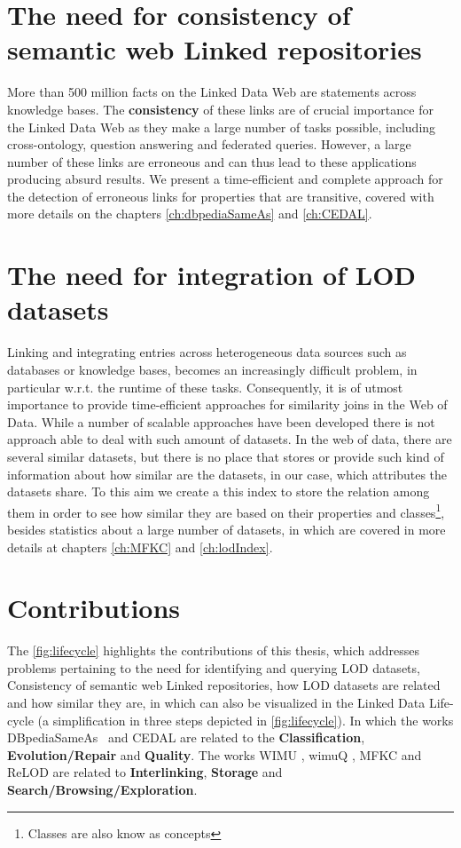 \section{The need for consistency of semantic web Linked repositories}
More than 500 million facts on the Linked Data Web are statements across knowledge bases. The \textbf{consistency} of these links are of crucial importance for the Linked Data Web as they make a large number of tasks possible, including  cross-ontology, question answering and federated queries. However, a large number of these links are erroneous and can thus lead to these applications producing absurd results. We present a time-efficient and complete approach for the detection of erroneous links for properties that are transitive\cite{valdestilhasdbpediasameas, valdestilhas2017cedal}, covered with more details on the chapters \ref{ch:dbpediaSameAs} and \ref{ch:CEDAL}.

\section{The need for integration of LOD datasets}
Linking and integrating entries across heterogeneous data sources such as databases or knowledge bases, becomes an increasingly difficult problem, in particular w.r.t. the runtime of these tasks. Consequently, it is of utmost importance to provide time-efficient approaches for similarity joins in the Web of Data. While a number of scalable approaches have been developed there is not approach able to deal with such amount of datasets. In the web of data, there are several similar datasets, but there is no place that stores or provide such kind of information about how similar are the datasets, in our case, which attributes the datasets share. To this aim we create a this index\cite{valdestilhas2019ReLOD} to store the relation among them in order to see how similar they are based on their properties and classes\footnote{Classes are also know as concepts}, besides statistics about a large number of datasets, in which are covered in more details at chapters \ref{ch:MFKC} and \ref{ch:lodIndex}.

\section{Contributions}
The \cref{fig:lifecycle} highlights the contributions of this thesis, which addresses
problems pertaining to the need for identifying and querying LOD datasets, Consistency of semantic web Linked repositories, how LOD datasets are related and how similar they are, in which can also be visualized in the Linked Data Life-cycle \cite{AUE+11} (a simplification in three steps depicted in \cref{fig:lifecycle}). In which the works DBpediaSameAs~\cite{valdestilhasdbpediasameas} and CEDAL \cite{valdestilhas2017cedal} are related to the \textbf{Classification}, \textbf{Evolution/Repair} and \textbf{Quality}. The works WIMU \cite{valdestilhas2018my}, wimuQ \cite{ValdestilhasKcap}, MFKC  \cite{valdestilhas2017high} and ReLOD \cite{valdestilhas2019ReLOD} are related to \textbf{Interlinking}, \textbf{Storage} and \textbf{Search/Browsing/Exploration}.

